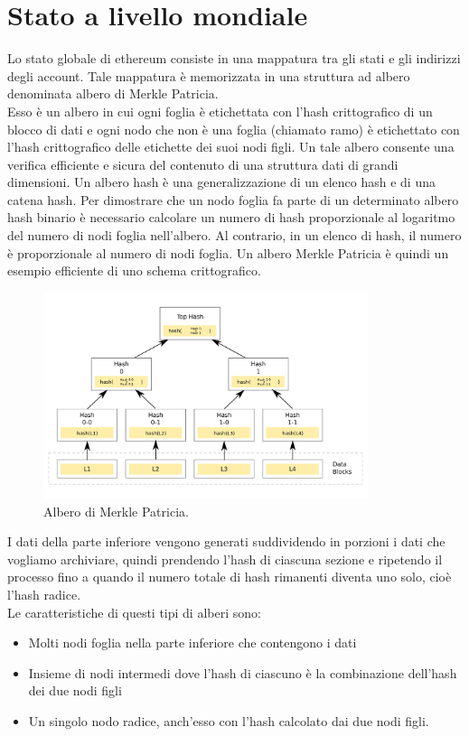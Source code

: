 \documentclass[a4paper,11pt]{report}
\begin{document}
\section{Stato a livello mondiale}
Lo stato globale di ethereum consiste in una mappatura tra gli stati e gli indirizzi degli account. Tale mappatura è memorizzata in una struttura ad albero denominata albero di Merkle Patricia.\\
Esso è un albero in cui ogni foglia è etichettata con l'hash crittografico di un blocco di dati e ogni nodo che non è una foglia (chiamato ramo) è etichettato con l'hash crittografico delle etichette dei suoi nodi figli. Un tale albero consente una verifica efficiente e sicura del contenuto di una struttura dati di grandi dimensioni. Un albero hash è una generalizzazione di un elenco hash e di una catena hash.
Per dimostrare che un nodo foglia fa parte di un determinato albero hash binario è necessario calcolare un numero di hash proporzionale al logaritmo del numero di nodi foglia nell'albero. Al contrario, in un elenco di hash, il numero è proporzionale al numero di nodi foglia. Un albero Merkle Patricia è quindi un esempio efficiente di uno schema crittografico.

\begin{figure}[htbp] 
\begin{center}
\includegraphics[width=9.5cm]{img/hs.png} 
\end{center}
\caption{Albero di Merkle Patricia. \cite{albero}}
\end{figure}
\newpage
I dati della parte inferiore vengono generati suddividendo in porzioni i dati che vogliamo archiviare, quindi prendendo l'hash di ciascuna sezione e ripetendo il processo fino a quando il numero totale di hash rimanenti diventa uno solo, cioè l'hash radice.\\
Le caratteristiche di questi tipi di alberi sono:
\begin{itemize}
\item Molti nodi foglia nella parte inferiore che contengono i dati
\item Insieme di nodi intermedi dove l'hash di ciascuno è la combinazione dell'hash dei due nodi figli
\item Un singolo nodo radice, anch'esso con l'hash calcolato dai due nodi figli.
\end{itemize}
\end{document}
